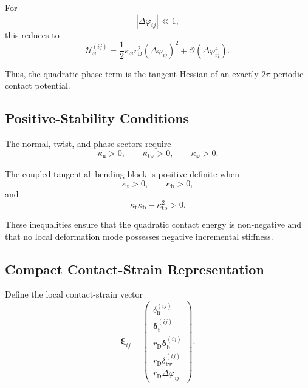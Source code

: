 For
\begin{equation}
    \left| \Delta\varphi_{ij} \right| \ll 1,
\end{equation}
this reduces to
\begin{equation}
    \mathcal{U}_{\varphi}^{(ij)} = \frac{1}{2} \kappa_{\varphi}r_{\mathrm{D}}^2 \left( \Delta\varphi_{ij} \right)^2 + \mathcal{O}\left( \Delta\varphi_{ij}^4 \right).
\end{equation}

Thus, the quadratic phase term is the tangent Hessian of an exactly $2\pi$-periodic contact potential.

\subsection{Positive-Stability Conditions}

The normal, twist, and phase sectors require
\begin{equation}
    \kappa_{\mathrm{n}} > 0, \qquad \kappa_{\mathrm{tw}} > 0, \qquad \kappa_{\varphi} > 0.
\end{equation}

The coupled tangential--bending block is positive definite when
\begin{equation}
    \kappa_{\mathrm{t}} > 0, \qquad \kappa_{\mathrm{b}} > 0,
\end{equation}
and
\begin{equation}
    \boxed{ \kappa_{\mathrm{t}}\kappa_{\mathrm{b}} - \kappa_{\mathrm{tb}}^2 > 0 }.
\end{equation}

These inequalities ensure that the quadratic contact energy is non-negative and that no local deformation mode possesses negative incremental stiffness.

\subsection{Compact Contact-Strain Representation}

Define the local contact-strain vector
\begin{equation}
    \boldsymbol{\xi}_{ij} =
    \begin{pmatrix}
        \delta_{\mathrm{n}}^{(ij)} \\
        \boldsymbol{\delta}_{\mathrm{t}}^{(ij)} \\
        r_{\mathrm{D}}\boldsymbol{\delta}_{\mathrm{b}}^{(ij)} \\
        r_{\mathrm{D}}\delta_{\mathrm{tw}}^{(ij)} \\
        r_{\mathrm{D}}\Delta\varphi_{ij}
    \end{pmatrix}.
\end{equation}


